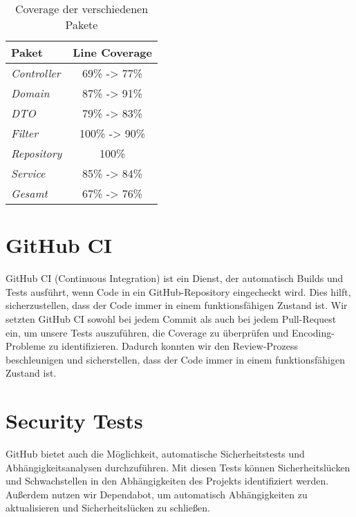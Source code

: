 \begin{table}[h]
    \centering
    \renewcommand{\arraystretch}{1.3}
    \begin{tabular}{l|c}
        \textbf{Paket} & \textbf{Line Coverage} \\
        \hline
        \hline
        \textit{Controller}  & 69\% -> 77\% \\
        \textit{Domain}      & 87\% -> 91\%\\
        \textit{DTO}         & 79\% -> 83\%\\
        \textit{Filter}      & 100\% -> 90\% \\
        \textit{Repository}  & 100\% \\
        \textit{Service}     & 85\% -> 84\% \\
        \hline
        \textit{Gesamt}      & 67\% -> 76\% \\
    \end{tabular}
    \caption{Coverage der verschiedenen Pakete}
    \label{tab:progress}
\end{table}

\newpage

\section{GitHub CI}
GitHub CI (Continuous Integration) ist ein Dienst, der automatisch Builds und Tests ausführt, wenn Code in ein GitHub-Repository eingecheckt wird.
Dies hilft, sicherzustellen, dass der Code immer in einem funktionsfähigen Zustand ist.
Wir setzten GitHub CI sowohl bei jedem Commit als auch bei jedem Pull-Request ein,
um unsere Tests auszuführen, die Coverage zu überprüfen und Encoding-Probleme zu identifizieren.
Dadurch konnten wir den Review-Prozess beschleunigen und sicherstellen, dass der Code immer in einem funktionsfähigen Zustand ist.

\section{Security Tests}
GitHub bietet auch die Möglichkeit, automatische Sicherheitstests und Abhängigkeitsanalysen durchzuführen.
Mit diesen Tests können Sicherheitslücken und Schwachstellen in den Abhängigkeiten des Projekts identifiziert werden.
Außerdem nutzen wir Dependabot, um automatisch Abhängigkeiten zu aktualisieren und Sicherheitslücken zu schließen.

